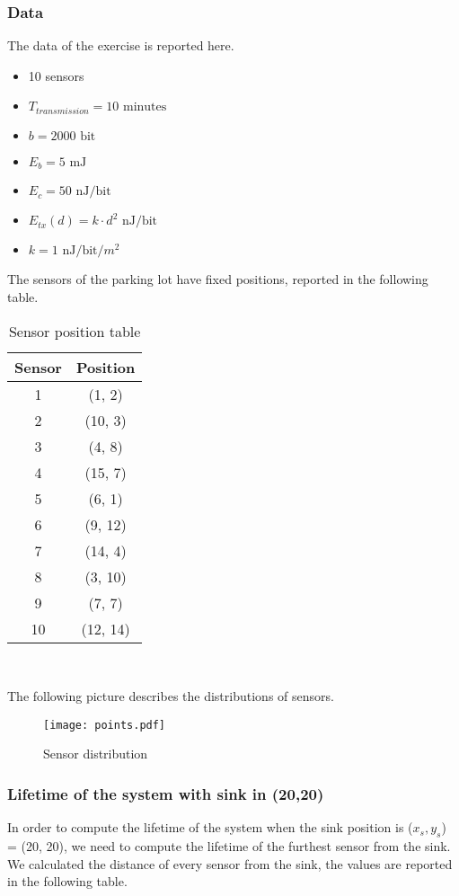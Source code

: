 \subsubsection{Data}

The data of the exercise is reported here.
\begin{itemize}
	\item 10 sensors
	\item $T_{transmission} = 10 \text{ minutes}$
	\item $b = 2000 \text{ bit}$
	\item $E_b = 5 \text{ mJ}$
	\item $E_c = 50 \text{ nJ/bit}$
	\item $E_{tx}(d) = k \cdot d^2 \text{ nJ/bit}$
	\item $k = 1 \text{ nJ/bit/$m^2$}$
\end{itemize}

The sensors of the parking lot have fixed positions, reported in the following table.
\begin{table}[H]
\centering 
\begin{tabular}{| c | c |}
	\hline 
	\rowcolor{bluepoli!40}
	\textbf{Sensor} & \textbf{Position}\T\B \\
	\hline 
	1 & (1, 2) \T\B\\
	2 &(10, 3) \T\B\\
	3 & (4, 8) \T\B\\
	4 & (15, 7) \T\B\\
	5  & (6, 1) \T\B\\
	6  & (9, 12) \T\B\\
	7  & (14, 4) \T\B\\
	8  & (3, 10) \T\B\\
	9  & (7, 7) \T\B\\
	10  & (12, 14) \T\B\\
	\hline
\end{tabular}
\\[10pt]
\caption{Sensor position table}
\label{table:sensor_position_table}
\end{table}

The following picture describes the distributions of sensors.
\begin{figure}[H]
    \centering
    \texttt{[image: points.pdf]}
    \caption{Sensor distribution}
    \label{fig:Sensor_distribution}
\end{figure}


\subsubsection{Lifetime of the system with sink in (20,20)}
In order to compute the lifetime of the system when the sink position is ($x_s, y_s$) = (20, 20), we need to compute the lifetime of the furthest sensor from the sink.\\
We calculated the distance of every sensor from the sink, the values are reported in the following table.

